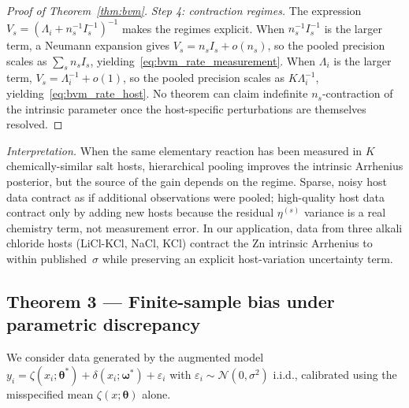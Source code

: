 \documentclass[12pt]{article}
\theoremstyle{plain}
\theoremstyle{definition}
\theoremstyle{remark}
\begin{document}
\begin{proof}[Proof of Theorem~\ref{thm:bvm}]
\emph{Step 4: contraction regimes.}  The expression
$V_s=(\Lambda_i+n_s^{-1}I_s^{-1})^{-1}$ makes the regimes explicit.  When
$n_s^{-1}I_s^{-1}$ is the larger term, a Neumann expansion gives
$V_s=n_s I_s+o(n_s)$, so the pooled precision scales as $\sum_s n_s I_s$,
yielding~\eqref{eq:bvm_rate_measurement}.  When $\Lambda_i$ is the larger
term, $V_s=\Lambda_i^{-1}+o(1)$, so the pooled precision scales as
$K\Lambda_i^{-1}$, yielding~\eqref{eq:bvm_rate_host}.  No theorem can
claim indefinite $n_s$-contraction of the intrinsic parameter once the
host-specific perturbations are themselves resolved.
\end{proof}

\emph{Interpretation.}  When the same elementary reaction has been
measured in $K$ chemically-similar salt hosts, hierarchical pooling
improves the intrinsic Arrhenius posterior, but the source of the gain
depends on the regime.  Sparse, noisy host data contract as if additional
observations were pooled; high-quality host data contract only by adding
new hosts because the residual $\eta^{(s)}$ variance is a real chemistry
term, not measurement error.  In our application, data from three alkali
chloride hosts (LiCl-KCl, NaCl, KCl) contract the Zn intrinsic Arrhenius
to within published~$\sigma$ while preserving an explicit host-variation
uncertainty term.

\subsection{Theorem 3 --- Finite-sample bias under parametric discrepancy}\label{sec:thm3}

We consider data generated by the augmented model
$y_i=\zeta(x_i;\boldsymbol\theta^*)+\delta(x_i;\boldsymbol\omega^*)+
\varepsilon_i$ with $\varepsilon_i\sim\mathcal{N}(0,\sigma^2)$
i.i.d., calibrated using the misspecified mean
$\zeta(x;\boldsymbol\theta)$ alone.
\end{document}
